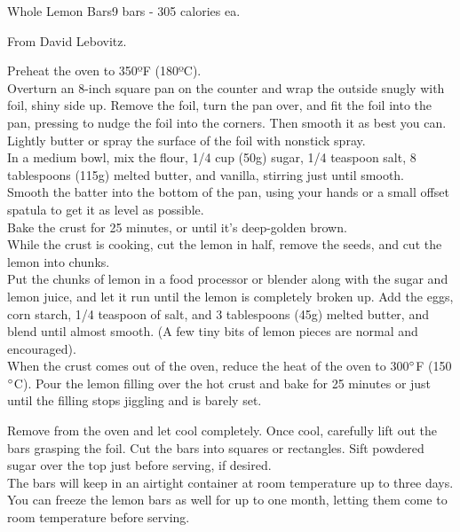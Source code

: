 \begin{recipe}{Whole Lemon Bars}{9 bars - 305 calories ea.}{}

\freeform From David Lebovitz.


Preheat the oven to 350ºF (180ºC).\\

Overturn an 8-inch square pan on the counter and wrap the outside snugly with foil, shiny side up. Remove the foil, turn the pan over, and fit the foil into the pan, pressing to nudge the foil into the corners. Then smooth it as best you can. Lightly butter or spray the surface of the foil with nonstick spray.\\

In a medium bowl, mix the flour, 1/4 cup (50g) sugar, 1/4 teaspoon salt, 8 tablespoons (115g) melted butter, and vanilla, stirring just until smooth.\\

Smooth the batter into the bottom of the pan, using your hands or a small offset spatula to get it as level as possible.\\

Bake the crust for 25 minutes, or until it’s deep-golden brown.\\

While the crust is cooking, cut the lemon in half, remove the seeds, and cut the lemon into chunks.\\

Put the chunks of lemon in a food processor or blender along with the sugar and lemon juice, and let it run until the lemon is completely broken up. Add the eggs, corn starch, 1/4 teaspoon of salt, and 3 tablespoons (45g) melted butter, and blend until almost smooth. (A few tiny bits of lemon pieces are normal and encouraged).\\

When the crust comes out of the oven, reduce the heat of the oven to 300$\degree$F (150$\degree$C). Pour the lemon filling over the hot crust and bake for 25 minutes or just until the filling stops jiggling and is barely set.\newpage

Remove from the oven and let cool completely. Once cool, carefully lift out the bars grasping the foil. Cut the bars into squares or rectangles. Sift powdered sugar over the top just before serving, if desired.\\

The bars will keep in an airtight container at room temperature up to three days. You can freeze the lemon bars as well for up to one month, letting them come to room temperature before serving.

\end{recipe}